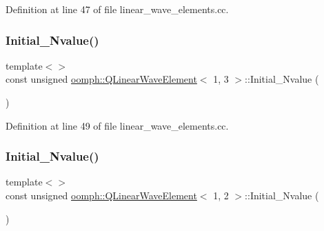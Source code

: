 Definition at line 47 of file linear\+\_\+wave\+\_\+elements.\+cc.

\mbox{\label{classoomph_1_1QLinearWaveElement_af31cb7564d802c1d280d533a0b4741cd}} 
\subsubsection{\texorpdfstring{Initial\+\_\+\+Nvalue()}{Initial\_Nvalue()}\hspace{0.1cm}{\footnotesize\ttfamily [2/9]}}
{\footnotesize\ttfamily template$<$$>$ \\
const unsigned \hyperlink{classoomph_1_1QLinearWaveElement}{oomph\+::\+Q\+Linear\+Wave\+Element}$<$ 1, 3 $>$\+::Initial\+\_\+\+Nvalue (\begin{DoxyParamCaption}{ }\end{DoxyParamCaption})\hspace{0.3cm}{\ttfamily [private]}}



Definition at line 49 of file linear\+\_\+wave\+\_\+elements.\+cc.

\mbox{\label{classoomph_1_1QLinearWaveElement_a961be768d058157a826416de8670f63c}} 
\subsubsection{\texorpdfstring{Initial\+\_\+\+Nvalue()}{Initial\_Nvalue()}\hspace{0.1cm}{\footnotesize\ttfamily [3/9]}}
{\footnotesize\ttfamily template$<$$>$ \\
const unsigned \hyperlink{classoomph_1_1QLinearWaveElement}{oomph\+::\+Q\+Linear\+Wave\+Element}$<$ 1, 2 $>$\+::Initial\+\_\+\+Nvalue (\begin{DoxyParamCaption}{ }\end{DoxyParamCaption})\hspace{0.3cm}{\ttfamily [private]}}



